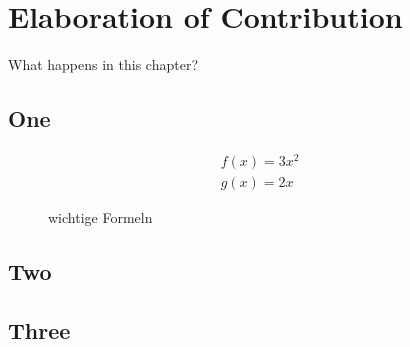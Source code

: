 \chapter{Elaboration of Contribution}

What happens in this chapter?

\section{One}

\begin{figure}[htp]
  \begin{align}
  f(x) = 3x^2 \\
  g(x) = 2x
  \end{align}
  \caption{wichtige Formeln}
\end{figure}

\section{Two}

\section{Three}
